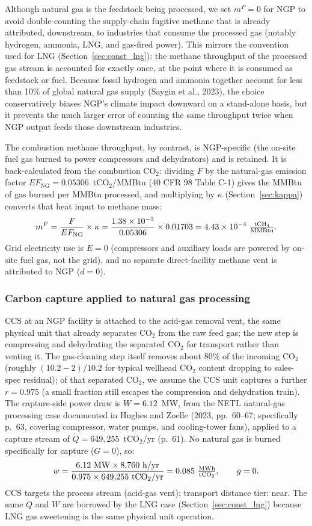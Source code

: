 \documentclass[11pt]{article}
\newcommand{\cotwo}{\ensuremath{\mathrm{CO_2}}}
\newcommand{\chfour}{\ensuremath{\mathrm{CH_4}}}
\begin{document}
Although natural gas is the feedstock being processed, we set $m^P = 0$ for NGP to avoid double-counting the supply-chain fugitive methane that is already attributed, downstream, to industries that consume the processed gas (notably hydrogen, ammonia, LNG, and gas-fired power). This mirrors the convention used for LNG (Section~\ref{sec:const_lng}): the methane throughput of the processed gas stream is accounted for exactly once, at the point where it is consumed as feedstock or fuel. Because fossil hydrogen and ammonia together account for less than 10\% of global natural gas supply (Saygin et al., 2023), the choice conservatively biases NGP's climate impact downward on a stand-alone basis, but it prevents the much larger error of counting the same throughput twice when NGP output feeds those downstream industries.

The combustion methane throughput, by contrast, is NGP-specific (the on-site fuel gas burned to power compressors and dehydrators) and is retained. It is back-calculated from the combustion \cotwo{}: dividing $F$ by the natural-gas emission factor $EF_{\text{NG}} = 0.05306$~t\cotwo{}/MMBtu (40 CFR 98 Table C-1) gives the MMBtu of gas burned per MMBtu processed, and multiplying by $\kappa$ (Section~\ref{sec:kappa}) converts that heat input to methane mass:
%
\[
  m^F = \frac{F}{EF_{\text{NG}}} \times \kappa = \frac{1.38 \times 10^{-3}}{0.05306} \times 0.01703 = 4.43 \times 10^{-4}~\tfrac{\text{t\chfour{}}}{\text{MMBtu}}.
\]
%
Grid electricity use is $E = 0$ (compressors and auxiliary loads are powered by on-site fuel gas, not the grid), and no separate direct-facility methane vent is attributed to NGP ($d = 0$).

\subsubsection{Carbon capture applied to natural gas processing}

CCS at an NGP facility is attached to the acid-gas removal vent, the same physical unit that already separates \cotwo{} from the raw feed gas; the new step is compressing and dehydrating the separated \cotwo{} for transport rather than venting it. The gas-cleaning step itself removes about 80\% of the incoming \cotwo{} (roughly $(10.2 - 2)/10.2$ for typical wellhead \cotwo{} content dropping to sales-spec residual); of that separated \cotwo{}, we assume the CCS unit captures a further $r = 0.975$ (a small fraction still escapes the compression and dehydration train). The capture-side power draw is $W = 6.12$~MW, from the NETL natural-gas processing case documented in Hughes and Zoelle (2023, pp.~60--67; specifically p.~63, covering compressor, water pumps, and cooling-tower fans), applied to a capture stream of $\dot{Q} = 649{,}255$~t\cotwo{}/yr (p.~61). No natural gas is burned specifically for capture ($G = 0$), so:
%
\[
  w = \frac{6.12~\text{MW} \times 8{,}760~\text{h/yr}}{0.975 \times 649{,}255~\text{t\cotwo{}/yr}} = 0.085~\tfrac{\text{MWh}}{\text{t\cotwo{}}}, \qquad g = 0.
\]
%
CCS targets the process stream (acid-gas vent); transport distance tier: near. The same $\dot{Q}$ and $W$ are borrowed by the LNG case (Section~\ref{sec:const_lng}) because LNG gas sweetening is the same physical unit operation.
\end{document}
